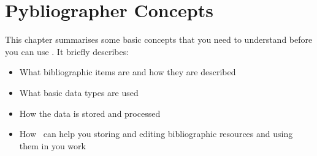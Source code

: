 
\chapter{Pybliographer Concepts}
\label{cha:rgconc}

This chapter summarises some basic concepts that you need to
understand before you can use \Pyb.
It briefly describes:
\begin{itemize}
\item What bibliographic items are and how they are described
\item What basic data types are used 
\item How the data is stored and processed
\item How \Pyb\ can help you storing and editing bibliographic
  resources and using them in you work
\end{itemize}








